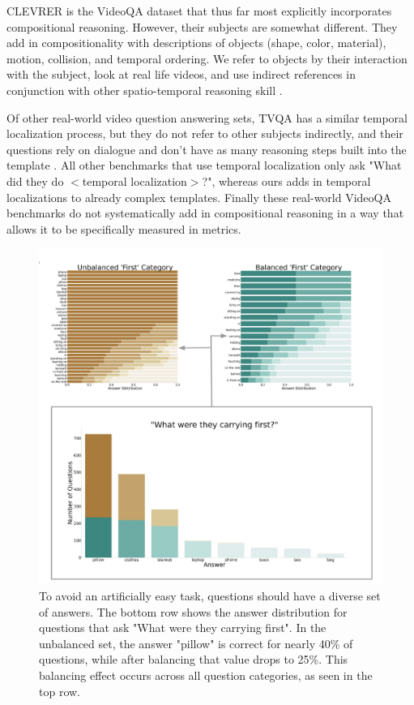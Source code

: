 \documentclass[10pt,twocolumn,letterpaper]{article}
\begin{document}
CLEVRER is the VideoQA dataset that thus far most explicitly incorporates compositional reasoning. However, their subjects are somewhat different. They add in compositionality with descriptions of objects (shape, color, material), motion, collision, and temporal ordering. We refer to objects by their interaction with the subject, look at real life videos, and use indirect references in conjunction with other spatio-temporal reasoning skill \cite{yi2019clevrer}.

Of other real-world video question answering sets, TVQA has a similar temporal localization process, but they do not refer to other subjects indirectly, and their questions rely on dialogue and don't have as many reasoning steps built into the template \cite{lei2018tvqa}. All other benchmarks that use temporal localization only ask "What did they do $<$temporal localization$>$?", whereas ours adds in temporal localizations to already complex templates. Finally these real-world VideoQA benchmarks do not systematically add in compositional reasoning in a way that allows it to be specifically measured in metrics. 



\begin{figure}[t]
    \centering
    \includegraphics[width=0.95\linewidth]{figures/balance first.pdf}
    \caption{To avoid an artificially easy task, questions should have a diverse set of answers. The bottom row shows the answer distribution for questions that ask "What were they carrying first". In the unbalanced set, the answer "pillow" is correct for nearly 40\% of questions, while after balancing that value drops to 25\%. This balancing effect occurs across all question categories, as seen in the top row.}
    \label{fig:balancefirst}
\end{figure}
\end{document}
